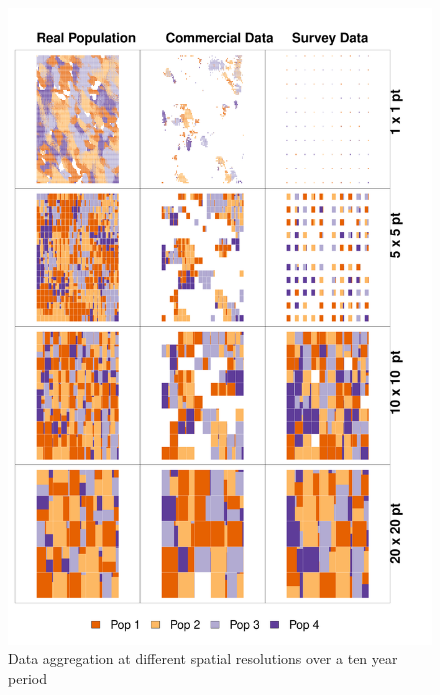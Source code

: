 \documentclass[review]{elsarticle}
\begin{document}
\begin{figure}[!ht]
	\includegraphics[width=\linewidth]{../analysis/Data_Aggregation_space_Rev2}
	\caption{Data aggregation at different spatial resolutions over a
		ten year period}
	\label{fig:1}
\end{figure}	
\end{document}
